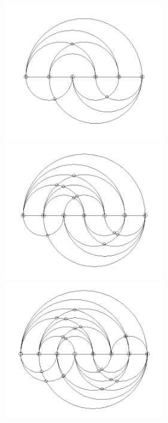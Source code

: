 	
	\begin{figure}
		\centering
		\includegraphics[width=7cm]{imagenes/grafo_1_bn_opt.png}
		\includegraphics[width=7cm]{imagenes/grafo_2_bn_opt.png}\\
		\includegraphics[width=7cm]{imagenes/grafo_3_bn_opt.png}

\end{figure}

